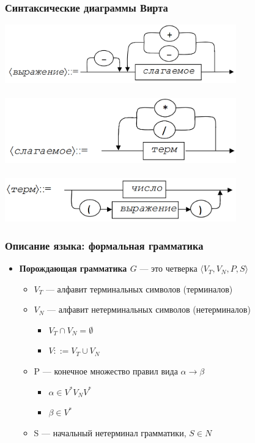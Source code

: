 \documentclass{beamer}
\begin{document}
\begin{frame}[fragile]
  \transwipe[direction=90]
  \frametitle{Синтаксические диаграммы Вирта}
\begin{center}
  \includegraphics[width=0.75\textwidth]{pics/sdexpr.png}  \\~\\     \pause
  \includegraphics[width=0.75\textwidth]{pics/sdfact.png}  \\~\\  \pause   
  \includegraphics[width=0.75\textwidth]{pics/sdterm.png}  
\end{center}
\end{frame}


\begin{frame}[fragile]
  \transwipe[direction=90]
  \frametitle{Описание языка: формальная грамматика}
  \begin{itemize}
    \item \textbf{Порождающая грамматика $G$} --- это четверка $\langle V_T, V_N, P, S \rangle$

   \begin{itemize}
     \item $V_T$ --- алфавит терминальных символов (терминалов) 
     \item $V_N$ --- алфавит нетерминальных символов (нетерминалов)
     \begin{itemize} 
        \item $V_T \cap V_N = \emptyset$ 
        \item $V ::= V_T \cup V_N$
     \end{itemize}
     \item P --- конечное множество правил вида $\alpha \rightarrow \beta$
     \begin{itemize}
       \item $\alpha \in V^* V_N V^*$
       \item $\beta \in V^*$
     \end{itemize}  
     \item S --- начальный нетерминал грамматики, $S  \in N$
  \end{itemize}
  \end{itemize}
\end{frame}
\end{document}
